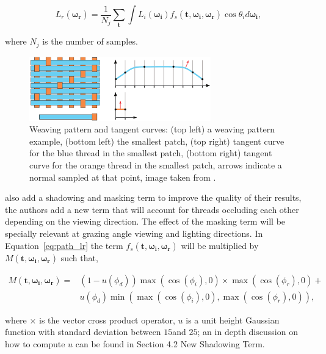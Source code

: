 \documentclass[12pt]{article}
\newcommand{\omegai}{\boldsymbol{\omega_i}}
\newcommand{\omegar}{\boldsymbol{\omega_r}}
\newcommand{\tb}{\mathbf{t}}
\begin{document}
\begin{equation}
L_{r}(\omegar) = \frac{1}{N_j} \sum_\tb \int L_i(\omegai) f_s(\tb, \omegai, \omegar) \cos \theta_i d \omegai,
\label{eq:path_lr}
\end{equation}

where $N_j$ is the number of samples.

\begin{figure}[htbp!]
\centering
\includegraphics[width=0.7\textwidth]{images/tanget_curve}
	\caption{Weaving pattern and tangent curves: (top left) a weaving pattern example, (bottom left) the smallest patch, (top right) tangent curve for the blue thread in the smallest patch, (bottom right) tangent curve for the orange thread in the smallest patch, arrows indicate a normal sampled at that point, image taken from \cite{Sadeghi2013}.}
	\label{fig:tanget_curve}
\end{figure}

\citeauthor{Sadeghi2013} also add a shadowing and masking term to improve the quality of their results, the authors add a new term that will account for threads occluding each other depending on the viewing direction.
The effect of the masking term will be specially relevant at grazing angle viewing and lighting directions.
In Equation~\ref{eq:path_lr} the term $f_s(\tb, \omegai, \omegar)$ will be multiplied by $M(\tb, \omegai, \omegar)$ such that,

\begin{equation}
\begin{split}
M(\tb, \omegai, \omegar) =& (1 - u(\phi_d)) \max(\cos(\phi_i), 0) \times \max(\cos(\phi_r), 0) + \\
& u(\phi_d) \min( \max(\cos(\phi_i), 0), \max(\cos(\phi_r), 0) ),
\end{split}
\end{equation}

where $\times$ is the vector cross product operator, $u$ is a unit height Gaussian function with standard deviation between $15$\textdegree and $25$\textdegree; an in depth discussion on how to compute $u$ can be found in \citeauthor{Ashikmin2000} \cite{Ashikmin2000} Section 4.2 New Shadowing Term.
\end{document}
